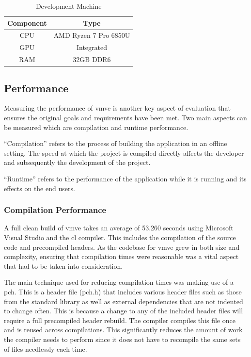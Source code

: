 \documentclass[11pt]{article}
\begin{document}
\begin{table}[h!]
\centering
\begin{tabular}{|| c c ||} 
  \hline
  Component & Type \\ [0.5ex] 
  \hline\hline
  CPU & AMD Ryzen 7 Pro 6850U  \\ 
  GPU & Integrated \\
  RAM & 32GB DDR6 \\ [1ex] 
  \hline
\end{tabular}
\caption{Development Machine}
\label{fig:development_machine}
\end{table}


\subsection{Performance}
Measuring the performance of \gls{vmve} is another key aspect of evaluation that
ensures the original goals and requirements have been met. Two main aspects can
be measured which are compilation and runtime performance.

``Compilation'' refers to the process of building the application in an offline
setting. The speed at which the project is compiled directly affects the
developer and subsequently the development of the project.

``Runtime'' refers to the performance of the application while it is running and
its effects on the end users.


\subsubsection{Compilation Performance}
A full clean build of \gls{vmve} takes an average of 53.260 seconds using
Microsoft Visual Studio and the \gls{cl} compiler. This includes the compilation
of the source code and precompiled headers. As the codebase for \gls{vmve} grew
in both size and complexity, ensuring that compilation times were reasonable was
a vital aspect that had to be taken into consideration.

The main technique used for reducing compilation times was making use of a
\gls{pch}. This is a header file (pch.h) that includes various header files such
as those from the standard library as well as external dependencies that are not
indented to change often. This is because a change to any of the included header
files will require a full precompiled header rebuild. The compiler compiles this
file once and is reused across compilations. This significantly reduces the
amount of work the compiler needs to perform since it does not have to recompile
the same sets of files needlessly each time.
\end{document}
